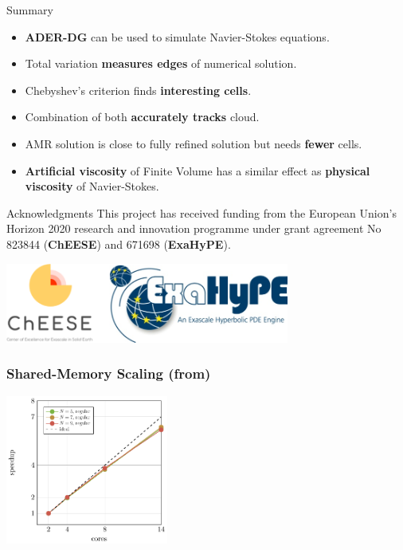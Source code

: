 \documentclass[aspectratio=169]{beamer}
\begin{document}
\begin{frame}{Summary}
    \begin{itemize}
    \item \textbf{ADER-DG} can be used to simulate Navier-Stokes equations.
    \item Total variation \textbf{measures edges} of numerical solution.
    \item Chebyshev's criterion finds \textbf{interesting cells}.
    \item Combination of both \textbf{accurately tracks} cloud.
    \item AMR solution is close to fully refined solution but needs \textbf{fewer} cells.
    \item \textbf{Artificial viscosity} of Finite Volume has a similar effect as \textbf{physical viscosity} of Navier-Stokes.  
    \end{itemize}
\end{frame}

\begin{frame}{Acknowledgments}
This project has received funding from the European Union's Horizon 2020 research and
innovation programme under grant agreement No 823844 (\textbf{ChEESE}) and 671698 (\textbf{ExaHyPE}).

\begin{center}
\includegraphics[width=0.7\textwidth]{logos}
\end{center}
\end{frame}

\begin{frame}
  \frametitle{Shared-Memory Scaling (from)}
  \begin{center}
     {
  \includegraphics[width=0.4\textwidth]{speedup_tbb}
    }
  \end{center}
  
\end{frame}
\end{document}
